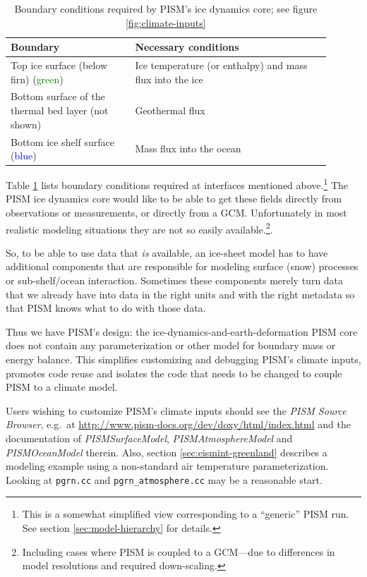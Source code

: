 \documentclass[11pt,final]{amsart}
\begin{document}
\begin{table}[h]
  \centering
  \begin{tabular}{p{0.35\linewidth}p{0.55\linewidth}}\\
    \hline
    \textbf{Boundary} & \textbf{Necessary conditions}\\
    \hline
    Top ice surface (below firn) (\textcolor{green}{green})& Ice temperature (or enthalpy) and mass flux into the ice\\
    Bottom surface of the thermal bed layer (not shown) & Geothermal flux\\
    Bottom ice shelf surface (\textcolor{blue}{blue})& Mass flux into the ocean\\
   \hline
  \end{tabular}
  \caption{Boundary conditions required by PISM's ice dynamics core; see figure
  \ref{fig:climate-inputs}}
  \label{tab:ice-dynamics-bc}
\end{table}

Table \ref{tab:ice-dynamics-bc} lists boundary conditions required at
interfaces mentioned above.\footnote{This is a somewhat simplified view  corresponding to a ``generic'' PISM run.   See section \ref{sec:model-hierarchy} for details.}  The PISM ice dynamics core would like to be able to get these fields directly from observations or measurements, or directly from a GCM.  Unfortunately in most realistic modeling situations they are not so easily available.\footnote{Including cases where PISM is coupled to a GCM---due to differences in model resolutions and required down-scaling.}.

So, to be able to use data that \emph{is} available, an ice-sheet model has to
have additional components that are responsible for modeling surface (snow)
processes or sub-shelf/ocean interaction.  Sometimes these components merely turn data that we already have into data in the right units and with the right metadata so that PISM knows what to do with those data.

Thus we have PISM's design: the ice-dynamics-and-earth-deformation PISM
core does not contain any parameterization or other model for boundary mass or
energy balance.  This simplifies customizing and debugging PISM's climate
inputs, promotes code reuse and isolates the code that needs to be changed to
couple PISM to a climate model.

Users wishing to customize PISM's climate inputs should see the \emph{PISM
  Source Browser}, e.g.~at
\url{http://www.pism-docs.org/dev/doxy/html/index.html} and the documentation
of \emph{PISMSurfaceModel}, \emph{PISMAtmosphereModel} and
\emph{PISMOceanModel} therein.  Also, section \ref{sec:eismint-greenland} describes a
modeling example using a non-standard air temperature parameterization. Looking
at \texttt{pgrn.cc} and \texttt{pgrn_atmosphere.cc} may be a reasonable
start.
\end{document}

